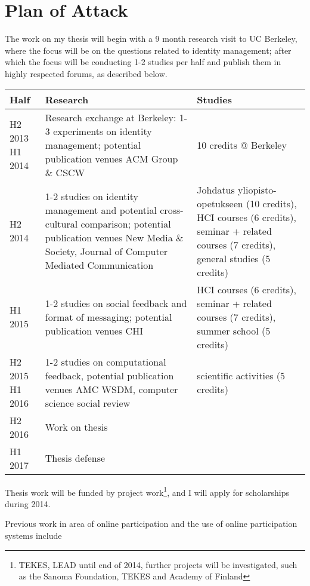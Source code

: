 \documentclass{article}
\begin{document}
\section{Plan of Attack}

The work on my thesis will begin with a 9 month research visit to UC Berkeley, where the focus will be on the questions related to identity management; after which the focus will be conducting 1-2 studies per half and publish them in highly respected forums, as described below.

\begin{table*}[!h]
\begin{tabular}{p{}p{}p{}}
Half & Research & Studies \\ 
\hline 
H2 2013 \newline H1 2014 & Research exchange at Berkeley: 1-3 experiments on identity management; potential publication venues ACM Group \& CSCW & 10 credits @ Berkeley \\ 
\hline
H2 2014 & 1-2 studies on identity management and potential cross-cultural comparison; potential publication venues New Media \& Society, Journal of Computer Mediated Communication & Johdatus yliopisto-opetukseen (10 credits), HCI courses (6 credits), seminar + related courses (7 credits), general studies (5 credits) \\ 
H1 2015 & 1-2 studies on social feedback and format of messaging; potential publication venues CHI & HCI courses (6 credits), seminar + related courses (7 credits), summer school (5 credits) \\ 
\hline
H2 2015 \newline H1 2016 & 1-2 studies on computational feedback, potential publication venues AMC WSDM, computer science social review & scientific activities (5 credits) \\ 
\hline
H2 2016 & Work on thesis & \\ 
H1 2017 & Thesis defense & \\ 
\hline 
\end{tabular} 
\end{table*}

Thesis work will be funded by project work\footnote{TEKES, LEAD until end of 2014, further projects will be investigated, such as the Sanoma Foundation, TEKES and Academy of Finland}, and I will apply for scholarships during 2014.

Previous work in area of online participation and the use of online participation systems include
\end{document}
